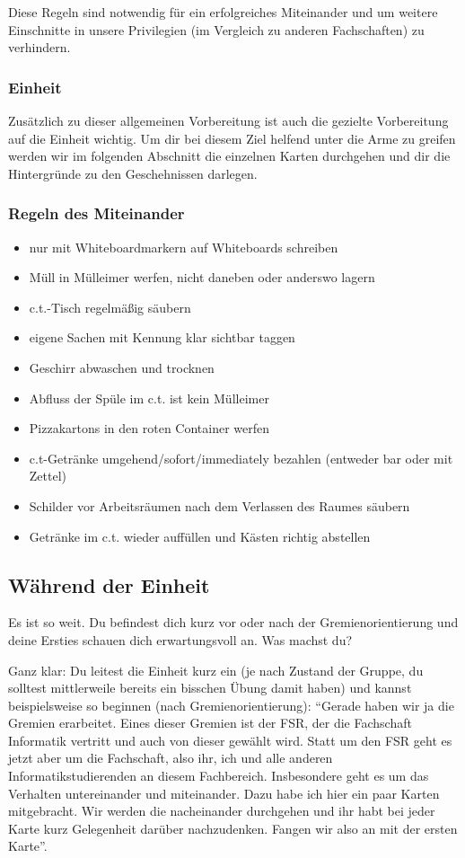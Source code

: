 \documentclass[a4paper,11pt]{scrartcl} %
\newenvironment{myitemize}{\begin{itemize}\itemsep -2pt}{\end{itemize}} %
\begin{document}
Diese Regeln sind notwendig für ein erfolgreiches Miteinander und um weitere Einschnitte in unsere Privilegien (im Vergleich zu anderen Fachschaften) zu verhindern.

\subsubsection*{Einheit}

Zusätzlich zu dieser allgemeinen Vorbereitung ist auch die gezielte Vorbereitung auf die Einheit wichtig. Um dir bei diesem Ziel helfend unter die Arme zu greifen werden wir im folgenden Abschnitt die einzelnen Karten durchgehen und dir die Hintergründe zu den Geschehnissen darlegen.

\subsubsection*{Regeln des Miteinander}
\begin{myitemize}
	\item nur mit Whiteboardmarkern auf Whiteboards schreiben
	\item Müll in Mülleimer werfen, nicht daneben oder anderswo lagern
	\item c.t.-Tisch regelmäßig säubern
	\item eigene Sachen mit Kennung klar sichtbar taggen
	\item Geschirr abwaschen und trocknen
	\item Abfluss der Spüle im c.t. ist kein Mülleimer
	\item Pizzakartons in den roten Container werfen
	\item c.t-Getränke umgehend/sofort/immediately bezahlen (entweder bar oder mit Zettel)
	\item Schilder vor Arbeitsräumen nach dem Verlassen des Raumes säubern
	\item Getränke im c.t. wieder auffüllen und Kästen richtig abstellen
\end{myitemize}


  \subsection{Während der Einheit}
Es ist so weit. Du befindest dich kurz vor oder nach der Gremienorientierung und deine Ersties schauen dich erwartungsvoll an. Was machst du?

Ganz klar: Du leitest die Einheit kurz ein (je nach Zustand der Gruppe, du solltest mittlerweile bereits ein bisschen Übung damit haben) und kannst beispielsweise so beginnen (nach Gremienorientierung): "`Gerade haben wir ja die Gremien erarbeitet. Eines dieser Gremien ist der FSR, der die Fachschaft Informatik vertritt und auch von dieser gewählt wird. Statt um den FSR geht es jetzt aber um die Fachschaft, also ihr, ich und alle anderen Informatikstudierenden an diesem Fachbereich.
Insbesondere geht es um das Verhalten untereinander und miteinander. Dazu habe ich hier ein paar Karten mitgebracht. Wir werden die nacheinander durchgehen und ihr habt bei jeder Karte kurz Gelegenheit darüber nachzudenken. Fangen wir also an mit der ersten Karte"'. 
\end{document}
